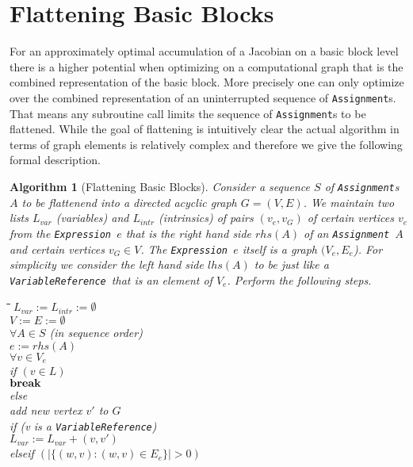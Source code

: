 \documentclass{book}
\newcommand{\Assignment}{{\tt Assignment}}
\newcommand{\Expression}{{\tt Expression}}
\newcommand{\VariableReference}{{\tt VariableReference}}
\newtheorem{Alg}{Algorithm}
\begin{document}
\section{Flattening Basic Blocks}
\label{sec:Flattening_Basic_Blocks}
For an approximately optimal accumulation of a Jacobian 
on a basic block level there is a higher potential when 
optimizing on a computational graph that is the combined 
representation of the basic block. More precisely one can only
optimize over the combined representation of an uninterrupted 
sequence of {\Assignment}s. That means any subroutine 
call limits the sequence of {\Assignment}s to be flattened.
While the goal of flattening is intuitively clear the actual 
algorithm in terms of graph elements is relatively complex and 
therefore we give the following formal description.
\begin{Alg}[Flattening Basic Blocks]
Consider a sequence $S$ of {\Assignment}s $A$ to be
flattenend into a 
  directed acyclic graph $G=(V,E)$. We maintain two lists $L_{var}$ 
(variables) 
and $L_{intr}$ (intrinsics)   
of pairs $(v_e,v_G)$ of certain vertices $v_e$ from the 
\Expression\ $e$ that is the right hand side $rhs(A)$ of an \Assignment\ $A$
and certain vertices $v_G \in V$. The \Expression\ $e$ itself is a graph 
$(V_e,E_e$). For simplicity we consider the left hand side $lhs(A)$ to be 
just like a \VariableReference\ that is an element of $V_e$.
Perform the following steps.
\begin{tabbing}
\hspace*{3ex}\=\hspace*{3ex}\=\hspace*{3ex}\=\hspace*{3ex}\=\hspace*{-13ex}
$L_{var}:=L_{intr}:=\emptyset$ \\
$V:=E:=\emptyset$ \\
$\forall  A \in S $ (in sequence order) \\
\> $e:=rhs(A)$ \\
\> $\forall v\in V_e$  \\
\>\> if $(v\in L)$  \\
\>\>\> ${\bf break}$\\
\>\> else\\
\>\>\> add new vertex $v'$ to $G$ \\ 
\>\>\> if (v is a \VariableReference)\\
\>\>\>\> $L_{var}:=L_{var}+(v,v')$\\
\>\>\> elseif $(|\{(w,v):(w,v)\in E_e\}|>0)$\\

\end{tabbing}
\end{Alg}
\end{document}
